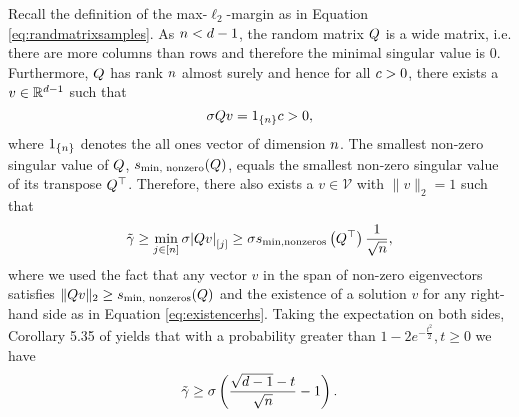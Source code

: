 
Recall the definition of the max-$\ell_2$-margin
as in Equation \ref{eq:randmatrixsamples}.
As $n < d-1$, the random matrix $Q$ is a wide
matrix, i.e. there are more columns than rows and therefore the
minimal singular value is $0$.
Furthermore, $Q$ has rank $n$ almost surely and hence 
for all $c >0$, there exists a $v \in \mathbb{R}^{d-1}$ such that
\begin{equation}
\label{eq:existencerhs}
 \sigma Q v= 1_{\{ n\}}c> 0,
\end{equation}
where $ 1_{\{ n \}}$ denotes the all ones vector of dimension $n$. The smallest non-zero singular value of $Q$, $s_{\text{min, nonzero}}(Q)$, equals the smallest non-zero singular value of its transpose $Q^{\top}$. Therefore, there also exists a $v \in \mathcal{V}$ with $\|v\|_2=1$ such that
\begin{equation}
\label{minimum_step_gamma}
\tilde{\gamma} \geq  \min_{j \in [n]} \sigma {|Qv|}_{[j]} \geq \sigma s_{\text{min,nonzeros}}\left(Q^{\top}\right)\frac{1}{\sqrt{n}},
\end{equation}
where we used the fact that any vector $v$ in the span of non-zero eigenvectors satisfies $\|Q  v \|_2 \geq s_{\text{min, nonzeros}}(Q)$ and the existence of a solution $v$ for any right-hand side as in Equation \ref{eq:existencerhs}.
Taking the expectation on both sides,
Corollary 5.35 of \cite{vershynin12} yields that with a probability greater than $1-2e^{-\frac{t^2}{2}}, t\geq 0$ we have
\begin{equation}
\tilde{\gamma} \geq \sigma\left( \frac{\sqrt{d-1}-t}{\sqrt{n}}-1\right).
\end{equation}

